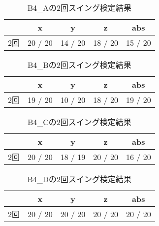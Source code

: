         \clearpage
        \begin{table}[tb]
            \caption{B4_Aの2回スイング検定結果}
            \vspace{0.5cm}
            \centering
            \begin{tabular}{|c|c|c|c|c|}
                \hline
                \diagbox{}{} & x & y & z & abs \\\hline
                2回 & 20 / 20 & 14 / 20 & 18 / 20 & 15 / 20 \\
                \hline
            \end{tabular}
        \end{table}
        \begin{table}[tb]
            \caption{B4_Bの2回スイング検定結果}
            \vspace{0.5cm}
            \centering
            \begin{tabular}{|c|c|c|c|c|}
                \hline
                \diagbox{}{} & x & y & z & abs \\\hline
                2回 & 19 / 20 & 10 / 20 & 18 / 20 & 19 / 20 \\
                \hline
            \end{tabular}
        \end{table}
        \begin{table}[tb]
            \caption{B4_Cの2回スイング検定結果}
            \vspace{0.5cm}
            \centering
            \begin{tabular}{|c|c|c|c|c|}
                \hline
                \diagbox{}{} & x & y & z & abs \\\hline
                2回 & 20 / 20 & 18 / 19 & 20 / 20 & 16 / 20 \\
                \hline
            \end{tabular}
        \end{table}
        \begin{table}[tb]
            \caption{B4_Dの2回スイング検定結果}
            \vspace{0.5cm}
            \centering
            \begin{tabular}{|c|c|c|c|c|}
                \hline
                \diagbox{}{} & x & y & z & abs \\\hline
                2回 & 20 / 20 & 20 / 20 & 20 / 20 & 20 / 20 \\
                \hline
            \end{tabular}
        \end{table}
